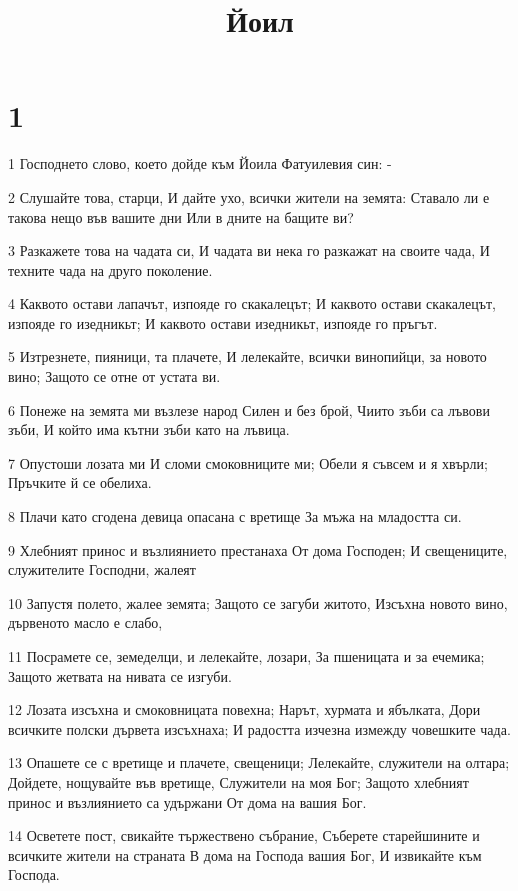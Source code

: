 

\title{Йоил}


\chapter{1}

\par 1 Господнето слово, което дойде към Йоила Фатуилевия син: -
\par 2 Слушайте това, старци, И дайте ухо, всички жители на земята: Ставало ли е такова нещо във вашите дни Или в дните на бащите ви?
\par 3 Разкажете това на чадата си, И чадата ви нека го разкажат на своите чада, И техните чада на друго поколение.
\par 4 Каквото остави лапачът, изпояде го скакалецът; И каквото остави скакалецът, изпояде го изедникьт; И каквото остави изедникьт, изпояде го пръгът.
\par 5 Изтрезнете, пияници, та плачете, И лелекайте, всички винопийци, за новото вино; Защото се отне от устата ви.
\par 6 Понеже на земята ми възлезе народ Силен и без брой, Чиито зъби са лъвови зъби, И който има кътни зъби като на лъвица.
\par 7 Опустоши лозата ми И сломи смоковниците ми; Обели я съвсем и я хвърли; Пръчките й се обелиха.
\par 8 Плачи като сгодена девица опасана с вретище За мъжа на младостта си.
\par 9 Хлебният принос и възлиянието престанаха От дома Господен; И свещениците, служителите Господни, жалеят
\par 10 Запустя полето, жалее земята; Защото се загуби житото, Изсъхна новото вино, дървеното масло е слабо,
\par 11 Посрамете се, земеделци, и лелекайте, лозари, За пшеницата и за ечемика; Защото жетвата на нивата се изгуби.
\par 12 Лозата изсъхна и смоковницата повехна; Нарът, хурмата и ябълката, Дори всичките полски дървета изсъхнаха; И радостта изчезна измежду човешките чада.
\par 13 Опашете се с вретище и плачете, свещеници; Лелекайте, служители на олтара; Дойдете, нощувайте във вретище, Служители на моя Бог; Защото хлебният принос и възлиянието са удържани От дома на вашия Бог.
\par 14 Осветете пост, свикайте тържествено събрание, Съберете старейшините и всичките жители на страната В дома на Господа вашия Бог, И извикайте към Господа.
